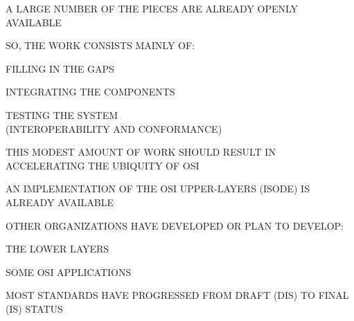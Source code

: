 \begin{bwslide}

\begin{nrtc}
\item	A LARGE NUMBER OF THE PIECES ARE ALREADY OPENLY AVAILABLE

\item	SO, THE WORK CONSISTS MAINLY OF:
    \begin{nrtc}
    \item	FILLING IN THE GAPS

    \item	INTEGRATING THE COMPONENTS

    \item	TESTING THE SYSTEM\\ (INTEROPERABILITY AND CONFORMANCE)
    \end{nrtc}

\item	THIS MODEST AMOUNT OF WORK SHOULD RESULT IN ACCELERATING THE UBIQUITY
	OF OSI
\end{nrtc}
\end{bwslide}


\begin{bwslide}

\begin{nrtc}
\item	AN IMPLEMENTATION OF THE OSI UPPER-LAYERS (ISODE) IS ALREADY AVAILABLE

\item	OTHER ORGANIZATIONS HAVE DEVELOPED OR PLAN TO DEVELOP:
    \begin{nrtc}
    \item	THE LOWER LAYERS

    \item	SOME OSI APPLICATIONS
    \end{nrtc}

\item	MOST STANDARDS HAVE PROGRESSED FROM DRAFT (DIS) TO FINAL (IS) STATUS
\end{nrtc}
\end{bwslide}


\begin{bwslide}
\end{bwslide}


\begin{bwslide}
\end{bwslide}


